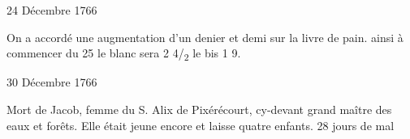                      \begin{diary}{24 Décembre 1766}{}

                         On a accordé une augmentation d’un
                           denier
                           et demi sur la livre de pain. ainsi à commencer
                           du 25 le blanc sera 2 4/\textsubscript{2} le bis 1 9. \bigskip


                     \end{diary}


                     \begin{diary}{30 Décembre 1766}{}

                         Mort de
                           Jacob, femme
                           du S. Alix de
                              Pixérécourt, cy-devant
                           grand maître
                           des eaux et forêts. Elle était jeune encore
                           et laisse quatre enfants. 28 jours de mal \bigskip


                     \end{diary}

